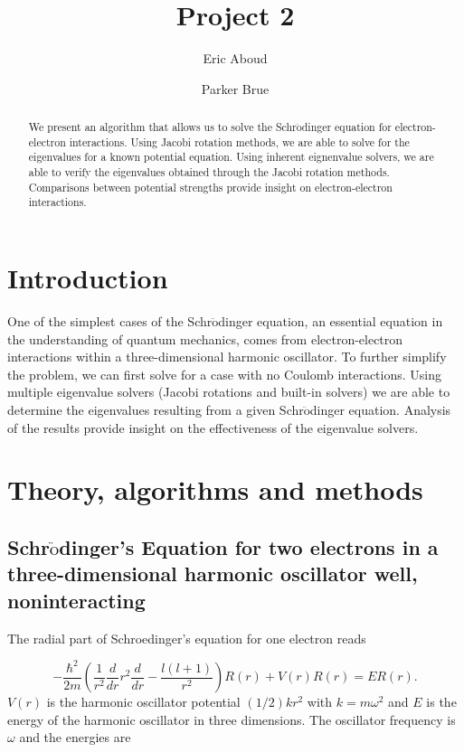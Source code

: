 \documentclass[%
reprint,
superscriptaddress,
showpacs,
nofootinbib,
bibnotes,amsmath,amssymb,aps,
prc, 
]{revtex4-1}
\begin{document}
	\title{Project 2}
	\author{Eric Aboud}
	\author{Parker Brue}
	\begin{abstract}
		We present an algorithm that allows us to solve the Schr$\ddot{\textrm{o}}$dinger equation for electron-electron interactions.  Using Jacobi rotation methods, we are able to solve for the eigenvalues for a known potential equation.  Using inherent eignenvalue solvers, we are able to verify the eigenvalues obtained through the Jacobi rotation methods.  Comparisons between potential strengths provide insight on electron-electron interactions.
	\end{abstract}
	\maketitle
	
	
	\section{Introduction}
	
	One of the simplest cases of the Schr$\ddot{\textrm{o}}$dinger equation, an essential equation in the understanding of quantum mechanics, comes from electron-electron interactions within a three-dimensional harmonic oscillator.  To further simplify the problem, we can first solve for a case with no Coulomb interactions.  Using multiple eigenvalue solvers (Jacobi rotations and built-in solvers) we are able to determine the eigenvalues resulting from a given Schr$\ddot{\textrm{o}}$dinger equation.  Analysis of the results provide insight on the effectiveness of the eigenvalue solvers.
	
	
	\section{Theory, algorithms and methods}
	\subsection{Schr$\ddot{\textrm{o}}$dinger's Equation for two electrons in a three-dimensional harmonic oscillator well, noninteracting}	
	The radial part of Schroedinger's equation for one electron reads
	
	\begin{equation*}
		-\frac{\hbar^2}{2 m} \left ( \frac{1}{r^2} \frac{d}{dr} r^2
		\frac{d}{dr} - \frac{l (l + 1)}{r^2} \right )R(r) 
		+ V(r) R(r) = E R(r).
	\end{equation*}
	$V(r)$ is the harmonic oscillator potential $(1/2)kr^2$ with
	$k=m\omega^2$ and $E$ is
	the energy of the harmonic oscillator in three dimensions.
	The oscillator frequency is $\omega$ and the energies are
	
\end{document}
